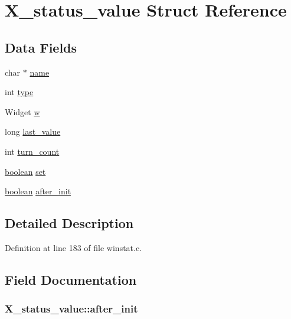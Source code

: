 \hypertarget{structX__status__value}{\section{X\+\_\+status\+\_\+value Struct Reference}
\label{structX__status__value}
}
\subsection*{Data Fields}
\begin{DoxyCompactItemize}
\item 
char $\ast$ \hyperlink{structX__status__value_ad24beb14f29271c622674dc81797cdf9}{name}
\item 
int \hyperlink{structX__status__value_a130c5921a3441f292f2e0ebd789c21fd}{type}
\item 
Widget \hyperlink{structX__status__value_a2e5d8f91c202cec7f989cdad7245fdd0}{w}
\item 
long \hyperlink{structX__status__value_aface1691c8a57b2f7f7c59b464b3a344}{last\+\_\+value}
\item 
int \hyperlink{structX__status__value_ae9fd670e041aba9ba612cfea4adab322}{turn\+\_\+count}
\item 
\hyperlink{global_8h_a531b10dd351aa162d7dcccd1966308b8}{boolean} \hyperlink{structX__status__value_a08f69b079a814b7d8af52d3cf6f567ad}{set}
\item 
\hyperlink{global_8h_a531b10dd351aa162d7dcccd1966308b8}{boolean} \hyperlink{structX__status__value_aed652819c84ca08930daf8358bea7905}{after\+\_\+init}
\end{DoxyCompactItemize}


\subsection{Detailed Description}


Definition at line 183 of file winstat.\+c.



\subsection{Field Documentation}
\hypertarget{structX__status__value_aed652819c84ca08930daf8358bea7905}{
\subsubsection[{after\+\_\+init}]{ X\+\_\+status\+\_\+value\+::after\+\_\+init}}\label{structX__status__value_aed652819c84ca08930daf8358bea7905}


